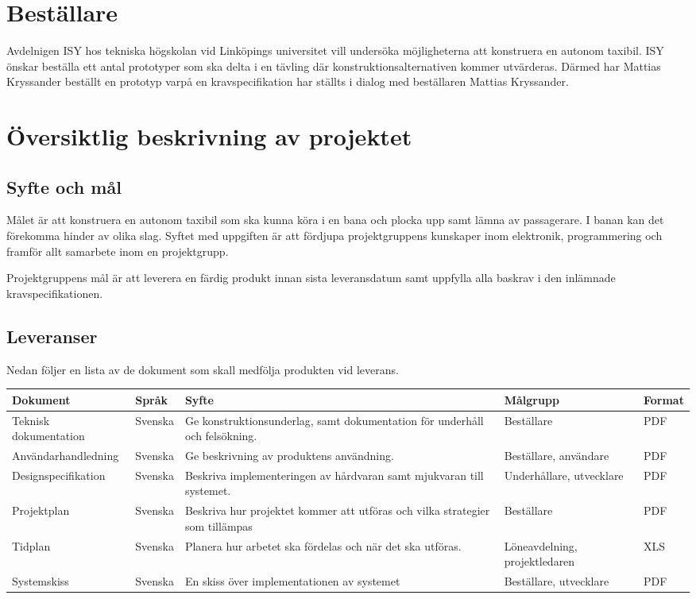 \documentclass[projektplan/plan.tex]{subfiles}
\begin{document}
\section{Beställare}
Avdelnigen ISY hos tekniska högskolan vid Linköpings universitet vill undersöka möjligheterna
att konstruera en autonom taxibil. ISY önskar beställa ett antal prototyper som ska delta i en
tävling där konstruktionsalternativen kommer utvärderas. Därmed har Mattias Kryssander beställt 
en prototyp varpå en kravspecifikation har ställts i dialog med beställaren Mattias Kryssander.
\section{Översiktlig beskrivning av projektet}
\subsection{Syfte och mål}
Målet är att konstruera en autonom taxibil som ska kunna köra i en bana och
plocka upp samt lämna av passagerare. I banan kan det förekomma hinder av olika
slag. Syftet med uppgiften är att fördjupa projektgruppens kunskaper inom
elektronik, programmering och framför allt samarbete inom en projektgrupp.

Projektgruppens mål är att leverera en färdig produkt innan sista leveransdatum
samt uppfylla alla baskrav i den inlämnade kravspecifikationen.
\subsection{Leveranser}
\label{sec:doc}
Nedan följer en lista av de dokument som skall medfölja produkten vid leverans.
{\renewcommand{\arraystretch}{1.6}
\begin{longtable}{p{4.5cm}p{1.5cm}p{5cm}p{2.2cm}p{1.2cm}}
    \bfseries Dokument &
    \bfseries Språk &
    \bfseries Syfte &
    \bfseries Målgrupp &
    \bfseries Format \\\hline
    Teknisk dokumentation &
    Svenska &
    Ge konstruktionsunderlag, samt dokumentation för underhåll och
    felsökning. &
    Beställare &
    PDF
    \\
    Användarhandledning &
    Svenska &
    Ge beskrivning av produktens användning. &
    Beställare, användare &
    PDF
    \\
    Designspecifikation &
    Svenska &
    Beskriva implementeringen av hårdvaran samt mjukvaran till systemet. &
    Underhållare, utvecklare &
    PDF
    \\
    Projektplan &
    Svenska &
    Beskriva hur projektet kommer att utföras och vilka strategier som
    tillämpas &
    Beställare &
    PDF
    \\
    Tidplan &
    Svenska &
    Planera hur arbetet ska fördelas och när det ska utföras. &
    Löne\-avdelning, projekt\-ledaren &
    XLS
    \\
    Systemskiss &
    Svenska &
    En skiss över implementationen av systemet &
    Beställare, utvecklare &
    PDF
    \\
    
    \endhead
\end{longtable}}
\end{document}
